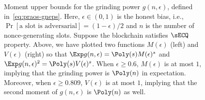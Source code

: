 \begin{figure}[!htb]
\begin{minipage}{0.5 \textwidth}
  \end{minipage}
  \caption[Grinding power moment bounds for Praos]{
    Moment upper bounds for the grinding power $g(n,\epsilon)$, defined in~\eqref{eq:praos-gneps}.
    Here, $\epsilon \in (0,1)$ is the honest bias, i.e., $\Pr[\text{a slot is adversarial}] = (1-\epsilon)/2$ 
    and $n$ is the number of nonce-generating slots. 
    Suppose the blockchain satisfies $\sECQ$ property.
    Above, we have plotted two functions $M(\epsilon)$ (left) and $V(\epsilon)$ (right) so that 
    $\Exp g(n,\epsilon) = \Poly(s) M(\epsilon)^s$ and $\Exp g(n,\epsilon)^2 = \Poly(s) V(\epsilon)^s$. 
    When $\epsilon \geq 0.6$, $M(\epsilon)$ is at most $1$, 
    implying that the grinding power is $\Poly(n)$ in expectation.
    Moreover, when $\epsilon \geq 0.809$, $V(\epsilon)$ is at most $1$, 
    implying that the second moment of $g(n, \epsilon)$ is $\Poly(n)$ as well. 
  }
  \label{fig:praos-gp-moments}
\end{figure}
